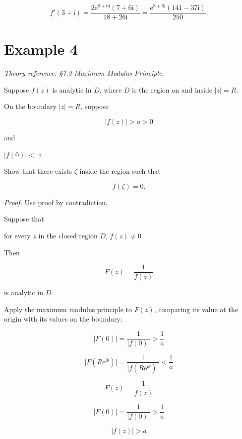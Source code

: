 \documentclass[11pt,a4paper]{article}
\theoremstyle{definition}
\theoremstyle{plain}
\begin{document}
\[
f'(3 + \mathrm{i}) = \frac{2\mathrm{e}^{8 + 6\mathrm{i}}(7 + 6\mathrm{i})}{18 + 26\mathrm{i}}
= \frac{\mathrm{e}^{8 + 6\mathrm{i}}(141 - 37\mathrm{i})}{250} .
\]

\section*{Example 4}

\textit{Theory reference: §7.3 Maximum Modulus Principle.}

Suppose $f(z)$ is analytic in $D$, where $D$ is the region on and inside $\vert{}z\vert{} = R$.

On the boundary $\vert{}z\vert{} = R$, suppose

\begin{equation}
\vert{}f(z)\vert{} > a > 0
\end{equation}

and

$\vert{}f(0)\vert{} <$ a

Show that there exists $\zeta$ inside the region such that

\begin{equation}
f(\zeta) = 0.
\end{equation}

\textit{Proof.} Use proof by contradiction.

Suppose that

for every $z$ in the closed region $D$, $f(z) \ne 0$.

Then

\begin{equation}
F(z) = \frac{1}{f(z)}
\end{equation}

is analytic in $D$.

Apply the maximum modulus principle to $F(z)$, comparing its value at the origin with its values on the boundary:

\begin{equation}
\vert{}F(0)\vert{} = \frac{1}{\vert{}f(0)\vert{}} > \frac{1}{a}
\end{equation}

\[
\vert{}F(R\mathrm{e}^{\mathrm{i}\theta})\vert{} = \frac{1}{\vert{}f(R\mathrm{e}^{\mathrm{i}\theta})\vert{}} < \frac{1}{a}
\]

\[
F(z) = \frac{1}{f(z)}
\]

\[
\vert{}F(0)\vert{} = \frac{1}{\vert{}f(0)\vert{}} > \frac{1}{a}
\]

\[
\vert{}f(z)\vert{} > a
\]
\end{document}
